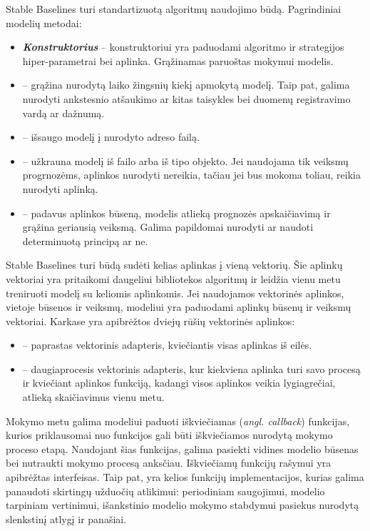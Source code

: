 \documentclass{VUMIFPSbakalaurinis}
\begin{document}
{
	Stable Baselines turi standartizuotą algoritmų naudojimo būdą. Pagrindiniai modelių metodai:
	\begin{itemize}
		\item \textbf{\textit{Konstruktorius}} -- konstruktoriui yra paduodami algoritmo ir strategijos hiper-parametrai bei aplinka. Grąžinamas paruoštas mokymui modelis.
		
		\item \textbf{} -- grąžina nurodytą laiko žingsnių kiekį apmokytą modelį. Taip pat, galima nurodyti ankstesnio atšaukimo ar kitas taisykles bei duomenų registravimo vardą ar dažnumą.
		
		\item  \textbf{} -- išsaugo modelį į nurodyto adreso failą.
		
		\item  \textbf{} -- užkrauna modelį iš failo arba iš  tipo objekto. Jei naudojama tik veiksmų progrnozėms, aplinkos nurodyti nereikia, tačiau jei bus mokoma toliau, reikia nurodyti aplinką.
		
		\item \textbf{} -- padavus aplinkos būseną, modelis atlieką prognozės apskaičiavimą ir grąžina geriausią veiksmą. Galima papildomai nurodyti ar naudoti determinuotą principą ar ne.
	\end{itemize}
	
	Stable Baselines turi būdą sudėti kelias aplinkas į vieną vektorių. Šie aplinkų vektoriai yra pritaikomi daugeliui bibliotekos algoritmų ir leidžia vienu metu treniruoti modelį su keliomis aplinkomis. Jei naudojamos vektorinės aplinkos, vietoje būsenos ir veiksmų, modeliui yra paduodami aplinkų būsenų ir veiksmų vektoriai. Karkase yra apibrėžtos dviejų rūšių vektorinės aplinkos:
	\begin{itemize}
		\item \textbf{} -- paprastas vektorinis adapteris, kviečiantis visas aplinkas iš eilės.
		\item \textbf{} -- daugiaprocesis vektorinis adapteris, kur kiekviena aplinka turi savo procesą ir kviečiant aplinkos funkciją, kadangi visos aplinkos veikia lygiagrečiai, atlieką skaičiavimus vienu metu.
	\end{itemize}

	Mokymo metu galima modeliui paduoti iškviečiamas (\textit{angl. callback}) funkcijas, kurios priklausomai nuo funkcijos gali būti iškviečiamos nurodytą mokymo proceso etapą. Naudojant šias funkcijas, galima pasiekti vidines modelio būsenas bei nutraukti mokymo procesą anksčiau. Iškviečiamų funkcijų rašymui yra apibrėžtas  interfeisas. Taip pat, yra kelios funkcijų implementacijos, kurias galima panaudoti skirtingų užduočių atlikimui: periodiniam saugojimui, modelio tarpiniam vertinimui, išankstinio modelio mokymo stabdymui pasiekus nurodytą slenkstinį atlygį ir panašiai.
	
}
\end{document}
